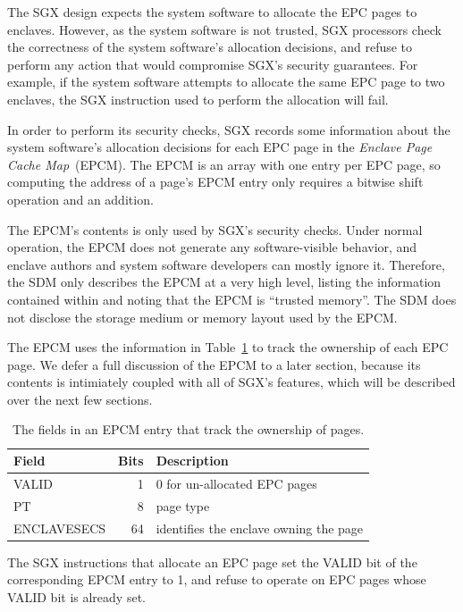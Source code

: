 The SGX design expects the system software to allocate the EPC pages to
enclaves. However, as the system software is not trusted, SGX processors check
the correctness of the system software's allocation decisions, and refuse to
perform any action that would compromise SGX's security guarantees. For
example, if the system software attempts to allocate the same EPC page to two
enclaves, the SGX instruction used to perform the allocation will fail.

In order to perform its security checks, SGX records some information about the
system software's allocation decisions for each EPC page in the
\textit{Enclave Page Cache Map}~(EPCM). The EPCM is an array with one entry
per EPC page, so computing the address of a page's EPCM entry only requires a
bitwise shift operation and an addition.

The EPCM's contents is only used by SGX's security checks. Under normal
operation, the EPCM does not generate any software-visible behavior, and
enclave authors and system software developers can mostly ignore it.
Therefore, the SDM only describes the EPCM at a very high level, listing the
information contained within and noting that the EPCM is ``trusted memory''.
The SDM does not disclose the storage medium or memory layout used by the EPCM.

The EPCM uses the information in Table~\ref{fig:sgx_epcm_ownership_fields} to
track the ownership of each EPC page. We defer a full discussion of the EPCM to
a later section, because its contents is intimiately coupled with all of SGX's
features, which will be described over the next few sections.

\begin{table}[hbt]
  \centering
  \begin{tabularx}{\columnwidth}{| l | r | X |}
  \hline
  \textbf{Field} & \textbf{Bits} & \textbf{Description}\\
  \hline
  VALID & 1 & 0 for un-allocated EPC pages \\
  \hline
  PT & 8 & page type \\
  \hline
  ENCLAVESECS & 64 & identifies the enclave owning the page \\
  \hline
  \end{tabularx}
  \caption{
    The fields in an EPCM entry that track the ownership of pages.
  }
  \label{fig:sgx_epcm_ownership_fields}
\end{table}

The SGX instructions that allocate an EPC page set the VALID bit of the
corresponding EPCM entry to 1, and refuse to operate on EPC pages whose VALID
bit is already set.

